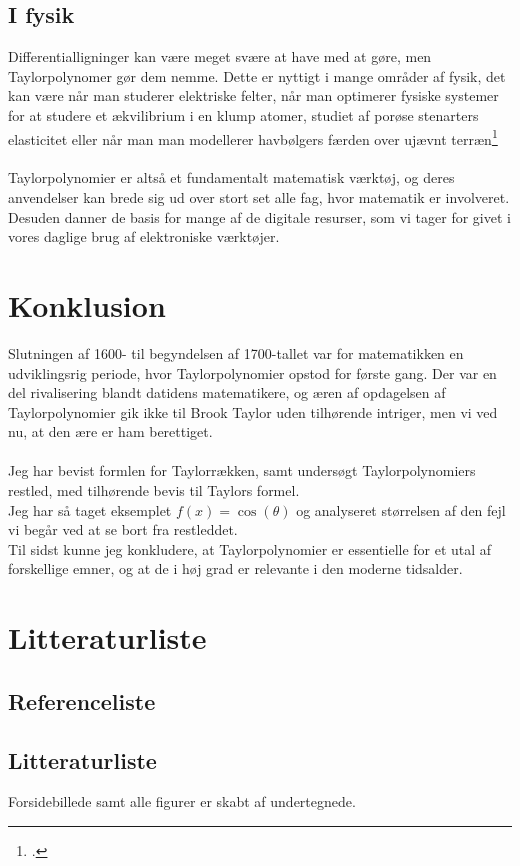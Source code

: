 \documentclass[12pt, a4paper]{article}
\begin{document}
\begin{refsection}
\subsection{I fysik}
Differentialligninger kan være meget svære at have med at gøre, men Taylorpolynomer gør dem nemme. Dette er nyttigt i mange områder af fysik, det kan være når man studerer elektriske felter, når man optimerer fysiske systemer for at studere et ækvilibrium i en klump atomer, studiet af porøse stenarters elasticitet eller når man man modellerer havbølgers færden over ujævnt terræn\footcite{applicationsoftaylor}\\
\\
Taylorpolynomier er altså et fundamentalt matematisk værktøj, og deres anvendelser kan brede sig ud over stort set alle fag, hvor matematik er involveret. Desuden danner de basis for mange af de digitale resurser, som vi tager for givet i vores daglige brug af elektroniske værktøjer.

\section{Konklusion} %
Slutningen af 1600- til begyndelsen af 1700-tallet var for matematikken en udviklingsrig periode, hvor Taylorpolynomier opstod for første gang. Der var en del rivalisering blandt datidens matematikere, og æren af opdagelsen af Taylorpolynomier gik ikke til Brook Taylor uden tilhørende intriger, men vi ved nu, at den ære er ham berettiget.\\
\\
Jeg har bevist formlen for Taylorrækken, samt undersøgt Taylorpolynomiers restled, med tilhørende bevis til Taylors formel.\\
Jeg har så taget eksemplet $f(x)=\cos{(\theta)}$ og analyseret størrelsen af den fejl vi begår ved at se bort fra restleddet.\\
Til sidst kunne jeg konkludere, at Taylorpolynomier er essentielle for et utal af forskellige emner, og at de i høj grad er relevante i den moderne tidsalder.
\section{Litteraturliste}
\subsection{Referenceliste}
\printbibliography[title=Cited]
\end{refsection}
\subsection{Litteraturliste}
\nocite{*}
\printbibliography
Forsidebillede samt alle figurer er skabt af undertegnede.
\end{document}
